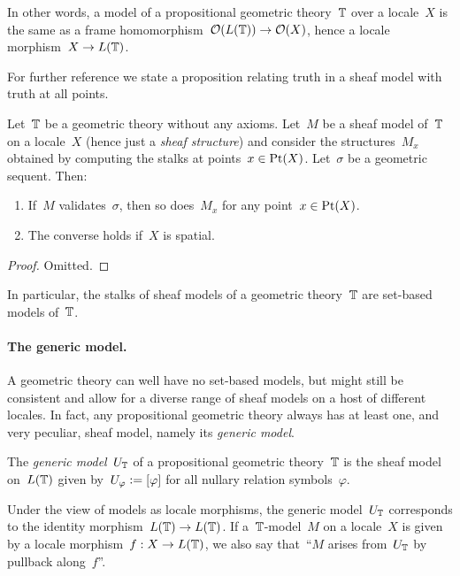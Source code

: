 \documentclass{ws-rv9x6}
\begin{document}
{In other words, a model of a propositional geometric theory~$\mathbb{T}$ over a
locale~$X$ is the same as a frame homomorphism~$\mathcal{O}(L(\mathbb{T})) \to \mathcal{O}(X)$, hence a
locale morphism~$X \to L(\mathbb{T})$.

For further reference we state a proposition relating truth in a sheaf model
with truth at all points.

\begin{proposition}\label{prop:at-points}
Let~$\mathbb{T}$ be a geometric theory without any axioms. Let~$M$ be a sheaf model
of~$\mathbb{T}$ on a locale~$X$ (hence just a \emph{sheaf structure}) and consider
the structures~$M_x$ obtained by computing the stalks at points~$x \in \mathrm{Pt}(X)$.
Let~$\sigma$ be a geometric sequent.
Then:
\begin{enumerate}
\item If~$M$ validates~$\sigma$, then so does~$M_x$ for any point~$x \in \mathrm{Pt}(X)$.
\item The converse holds if~$X$ is spatial.
\end{enumerate}
\end{proposition}

\begin{proof}Omitted.\end{proof}

In particular, the stalks of sheaf models of a geometric theory~$\mathbb{T}$ are
set-based models of~$\mathbb{T}$.

\paragraph{The generic model.}
A geometric theory can well have no set-based models, but might still be
consistent and allow for a diverse range of sheaf models on a host of different
locales. In fact, any propositional geometric theory always has at least one,
and very peculiar, sheaf model, namely its \emph{generic model}.

\begin{definition}The \emph{generic model}~$U_{\mathbb{T}}$ of a propositional geometric
theory~$\mathbb{T}$ is the sheaf model on~$L(\mathbb{T})$ given by~$U_\varphi \vcentcolon=
[\varphi]$ for all nullary relation symbols~$\varphi$.\end{definition}

Under the view of models as locale morphisms, the generic model~$U_{\mathbb{T}}$
corresponds to the identity morphism~$L(\mathbb{T}) \to L(\mathbb{T})$. If a~$\mathbb{T}$-model~$M$ on
a locale~$X$ is given by a locale morphism~$f : X \to L(\mathbb{T})$, we also say
that~``$M$ arises from~$U_{\mathbb{T}}$ by pullback along~$f$''.

}
\end{document}
